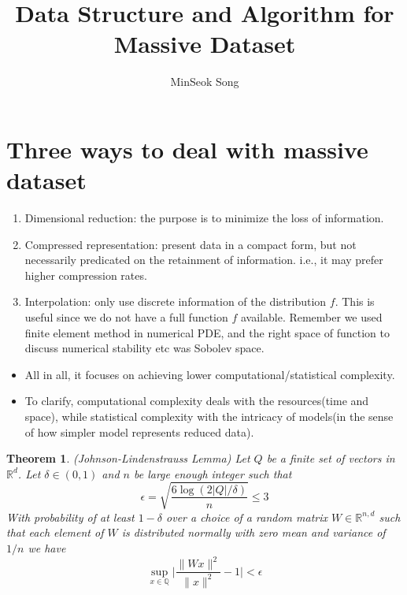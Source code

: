 \documentclass[11pt,reqno]{amsart}
\title{Data Structure and Algorithm for Massive Dataset}
\author{MinSeok Song}
\date{}
\newtheorem{theorem}{Theorem}
\theoremstyle{remark}
\begin{document}
\maketitle
\begin{sloppypar}
\tableofcontents
\section{Three ways to deal with massive dataset}
\begin{enumerate}
\item Dimensional reduction: the purpose is to minimize the loss of information.
\item Compressed representation: present data in a compact form, but not necessarily predicated on the retainment 
of information. i.e., it may prefer higher compression rates.
\item Interpolation: only use discrete information of the distribution $f$. 
This is useful since we do not have a full function $f$ available. Remember we 
used finite element method in numerical PDE, and the right space of function to discuss
 numerical stability etc was Sobolev space.
\end{enumerate}
\begin{itemize}
\item All in all, it focuses on achieving lower computational/statistical complexity.
\item To clarify, computational complexity deals with the resources(time and space), 
while statistical complexity with the intricacy of models(in the sense of how simpler model represents reduced data). 
\end{itemize}
\begin{theorem} (Johnson-Lindenstrauss Lemma)
Let $Q$ be a finite set of vectors in $\mathbb{R}^d$. Let $\delta\in (0,1)$ and $n$ be large enough integer such that
\begin{equation}
\epsilon = \sqrt{\frac{6\log (2\lvert Q\rvert/\delta)}n}\leq 3
\end{equation}
With probability of at least $1-\delta$ over a choice of a random matrix $W\in\mathbb{R}^{n,d}$
 such that each element of $W$ is distributed normally with zero mean and variance of $1/n$ we have
\begin{equation}
\sup_{x\in\mathbb{Q}}\lvert \frac{\lVert Wx\rVert^2}{\lVert x\rVert^2}-1\rvert < \epsilon
\end{equation}
\end{theorem}
\begin{itemize}

\end{itemize}
\end{sloppypar}
\end{document}
